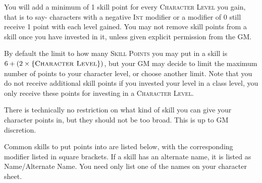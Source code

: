You will add a minimum of 1 skill point for every \textsc{Character Level} you gain, that is to say- characters with a negative \textsc{Int} modifier or a modifier of 0 still receive 1 point with each level gained. You may not remove skill points from a skill once you have invested in it, unless given explicit permission from the GM.

By default the limit to how many \textsc{Skill Points} you may put in a skill is $6+(2\times \{ \textsc{Character Level} \})$, but your GM may decide to limit the maximum number of points to your character level, or choose another limit. Note that you do not receive additional skill points if you invested your level in a class level, you only receive these points for investing in a \textsc{Character Level}.

There is technically no restriction on what kind of skill you can give your character points in, but they should not be too broad. This is up to GM discretion.

Common skills to put points into are listed below, with the corresponding modifier listed in square brackets. If a skill has an alternate name, it is listed as Name/Alternate Name. You need only list one of the names on your character sheet.

